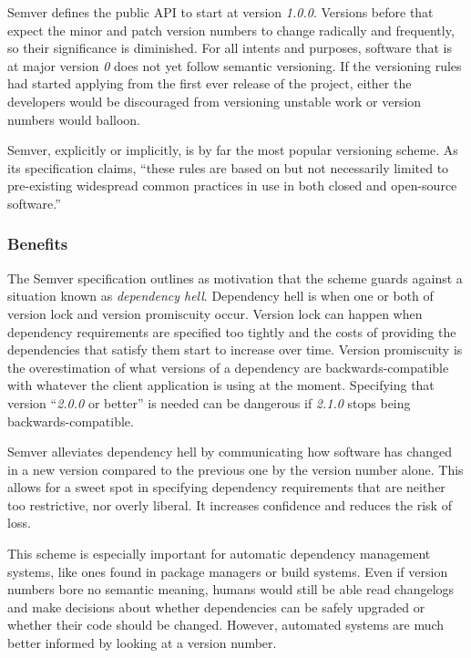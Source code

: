 \documentclass{l4proj}
\begin{document}
Semver defines the public API to start at version \textit{1.0.0}.
Versions before that expect the minor and patch version numbers to
change radically and frequently, so their significance is diminished.
For all intents and purposes, software that is at major version
\textit{0} does not yet follow semantic versioning.
If the versioning rules had started applying from the first ever
release of the project, either the developers would be discouraged
from versioning unstable work or version numbers would balloon.

Semver, explicitly or implicitly, is by far the most popular
versioning scheme. As its specification claims, ``these rules are
based on but not necessarily limited to pre-existing widespread common
practices in use in both closed and open-source software.''

\subsubsection{Benefits}

The Semver specification outlines as motivation that the scheme guards
against a situation known as \textit{dependency hell}. Dependency hell
is when one or both of version lock and version promiscuity occur.
Version lock can happen when dependency requirements are specified too
tightly and the costs of providing the dependencies that satisfy them
start to increase over time. Version promiscuity is the overestimation
of what versions of a dependency are backwards-compatible with whatever
the client application is using at the moment. Specifying that version
``\textit{2.0.0} or better'' is needed can be dangerous if
\textit{2.1.0} stops being backwards-compatible.

Semver alleviates dependency hell by communicating how software has
changed in a new version compared to the previous one by the version
number alone. This allows for a sweet spot in specifying dependency
requirements that are neither too restrictive, nor overly liberal.
It increases confidence and reduces the risk of loss.

This scheme is especially important for automatic dependency
management systems, like ones found in package managers or build
systems. Even if version numbers bore no semantic meaning, humans
would still be able read changelogs and make decisions about whether
dependencies can be safely upgraded or whether their code should be
changed. However, automated systems are much better informed by
looking at a version number.
\end{document}
